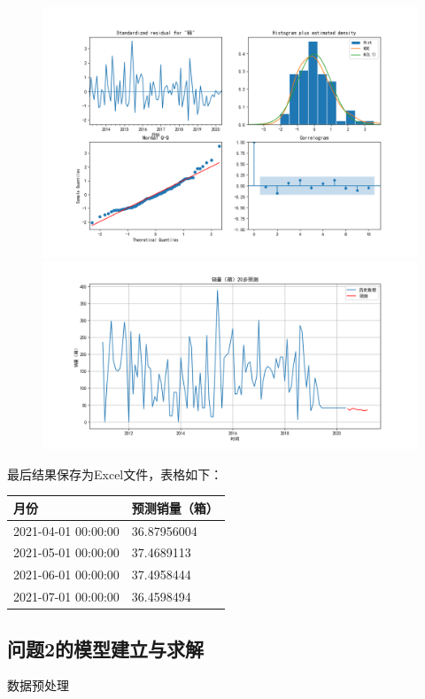 \documentclass[a4paper]{article}
\begin{document}
	\begin{figure}[H]
		\centering
		\includegraphics[width=1.0\textwidth]{img/A2_1.png}
		\includegraphics[width=1.0\textwidth]{img/A2_2.png}
	\end{figure}
	最后结果保存为Excel文件，表格如下：

	\setlength{\extrarowheight}{4pt}
	\begin{table}[H]
		\centering
		\begin{tabularx}{\textwidth}{|X|X|} %
			\hline
			月份 & 预测销量（箱）\\
			\hline
			2021-04-01 00:00:00 & 36.87956004\\
			\hline
			2021-05-01 00:00:00 & 37.4689113\\
			\hline
			2021-06-01 00:00:00 & 37.4958444\\
			\hline
			2021-07-01 00:00:00 & 36.4598494\\
			\hline
		\end{tabularx}
	\end{table}
	\subsection{问题2的模型建立与求解}
	数据预处理
\end{document}
